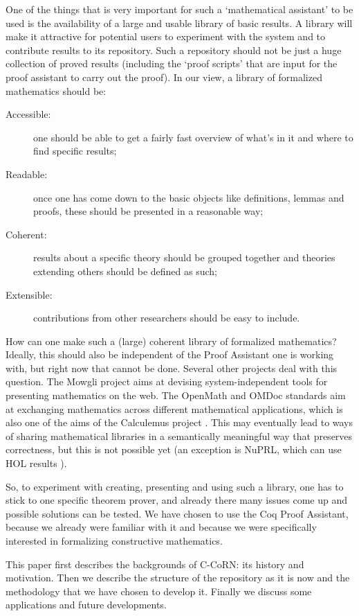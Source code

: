 \documentclass[runningheads]{llncs}
\newcommand{\ccorn}{\mbox{C-CoRN}}
\begin{document}
One of the things that is very important for such a `mathematical
assistant' to be used is the availability of a large and usable
library of basic results.  A library will make it attractive for
potential users to experiment with the system and to contribute
results to its repository. Such a repository should not be just a
huge collection of proved results (including the `proof scripts' that
are input for the proof assistant to carry out the proof). In our
view, a library of formalized mathematics should be:
\begin{description}
\item[Accessible:] one should be able to get a fairly fast overview 
of what's in it and where to find specific results;
\item[Readable:] once one has come down to the basic objects like 
definitions, lemmas and proofs, these should be presented in a
reasonable way;
\item[Coherent:] results about a specific theory should be grouped 
together and theories extending others should be defined as such;
\item[Extensible:] contributions 
from other researchers should be easy to include.
\end{description}
How can one make such a (large) coherent library of formalized mathematics? 
Ideally, this should also be independent of the Proof Assistant one is
working with, but right now that cannot be done.
Several other projects deal with this question. The Mowgli
project \cite{mowgli} aims at devising system-independent tools for
presenting mathematics on the web. The OpenMath \cite{openmath} and OMDoc
\cite{OMDoc} standards aim at exchanging mathematics across different
mathematical applications, which is also one of the aims of the
Calculemus project \cite{calculemus}. This may eventually lead to ways
of sharing mathematical libraries in a semantically meaningful way
that preserves correctness, but this is not possible yet
(an exception is NuPRL, which can use HOL results \cite{hol-to-nuprl}).

So, to experiment with creating, presenting and using such a library,
one has to stick to one specific theorem prover, and already there
many issues come up and possible solutions can be tested. We have
chosen to use the Coq Proof Assistant, because we already were
familiar with it and because we were specifically interested in
formalizing constructive mathematics. 

This paper first describes the backgrounds of \ccorn: its history and
motivation. Then we describe the structure of the repository as it is
now and the methodology that we have chosen to develop it. Finally we
discuss some applications and future developments.
\end{document}
